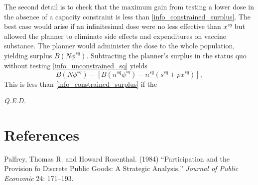 \documentclass[12pt]{article}
\newcommand{\efficacy}{\phi}
\newcommand{\side}{s}
\newcommand{\sqdose}{x^{sq}}
\newcommand{\sqefficacy}{\efficacy^{sq}}
\newcommand{\sqside}{\side^{sq}}
\newcommand{\sqnumber}{n^{sq}}
\newcommand{\benefit}{B}
\renewcommand{\qed}{{\it Q.E.D.}}
\begin{document}
The second detail is to check that the maximum gain from testing a lower dose in the absence of a capacity constraint is less than \eqref{info_constrained_surplus}. The best case would arise if an infinitesimal dose were no less effective than $\sqdose$ but allowed the planner to eliminate side effects and expenditures on vaccine substance. The planner would administer the dose to the whole population, yielding surplus $\benefit(N \sqefficacy)$. Subtracting the planner's surplus in the status quo without testing \eqref{info_unconstrained_sq} yields
\begin{equation}
\label{a:info_unconstrained_diff}
\benefit(N \sqefficacy) - \left[ \benefit(\sqnumber \sqefficacy) - \sqnumber (\sqside + p \sqdose) \right],
\end{equation}
This is less than \eqref{info_constrained_surplus} if the 


\qed


\clearpage

\section*{References}

\begin{description}

\frenchspacing

\item Palfrey, Thomas R. and Howard Rosenthal. (1984) ``Participation and the Provision fo Discrete Public Goods: A Strategic Analysis,'' {\em Journal of Public Economic} 24: 171--193. 

\end{description}
\end{document}
